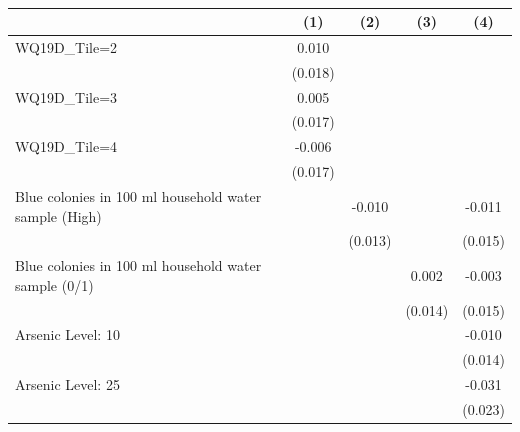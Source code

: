 \begin{table}[htbp]\centering
\def\sym#1{\ifmmode^{#1}\else\(^{#1}\)\fi}
\caption{ \label{}}
\begin{tabular}{l*{4}{c}}
\hline\hline
                    &\multicolumn{1}{c}{(1)}         &\multicolumn{1}{c}{(2)}         &\multicolumn{1}{c}{(3)}         &\multicolumn{1}{c}{(4)}         \\
\hline
WQ19D_Tile=2        &       0.010         &                     &                     &                     \\
                    &     (0.018)         &                     &                     &                     \\
[1em]
WQ19D_Tile=3        &       0.005         &                     &                     &                     \\
                    &     (0.017)         &                     &                     &                     \\
[1em]
WQ19D_Tile=4        &      -0.006         &                     &                     &                     \\
                    &     (0.017)         &                     &                     &                     \\
[1em]
Blue colonies in 100 ml household water sample (High)&                     &      -0.010         &                     &      -0.011         \\
                    &                     &     (0.013)         &                     &     (0.015)         \\
[1em]
Blue colonies in 100 ml household water sample (0/1)&                     &                     &       0.002         &      -0.003         \\
                    &                     &                     &     (0.014)         &     (0.015)         \\
[1em]
Arsenic Level: 10   &                     &                     &                     &      -0.010         \\
                    &                     &                     &                     &     (0.014)         \\
[1em]
Arsenic Level: 25   &                     &                     &                     &      -0.031         \\
                    &                     &                     &                     &     (0.023)         \\

\end{tabular}
\end{table}
